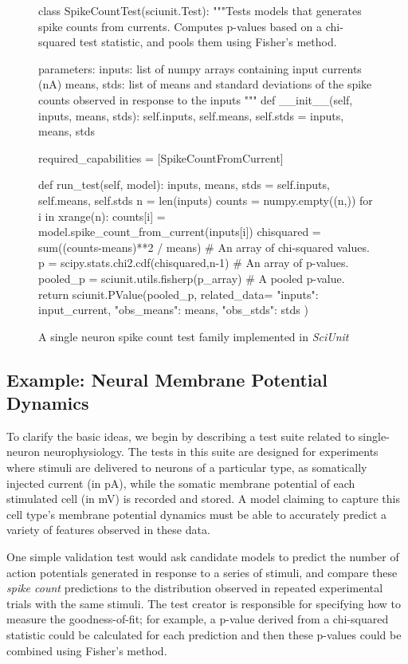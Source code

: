 \documentclass[11pt,letterpaper]{article}
\begin{document}
\begin{figure}
\small
\begin{python}
class SpikeCountTest(sciunit.Test):
  """Tests models that generates spike counts from currents. Computes p-values based on a chi-squared test statistic, and pools them using Fisher's method.

  parameters:
    inputs: list of numpy arrays containing input currents (nA)
    means, stds: list of means and standard deviations of the 
      spike counts observed in response to the inputs
  """
  def __init__(self, inputs, means, stds):
    self.inputs, self.means, self.stds = inputs, means, stds
	
  required_capabilities = [SpikeCountFromCurrent]
	
  def run_test(self, model):
    inputs, means, stds = self.inputs, self.means, self.stds
    n = len(inputs)
    counts = numpy.empty((n,))
    for i in xrange(n):
      counts[i] = model.spike_count_from_current(inputs[i])
    chisquared = sum((counts-means)**2 / means) # An array of chi-squared values.  
    p = scipy.stats.chi2.cdf(chisquared,n-1) # An array of p-values.  
    pooled_p = sciunit.utils.fisherp(p_array) # A pooled p-value.  
    return sciunit.PValue(pooled_p, related_data={
      "inputs": input_current,
      "obs_means": means,
      "obs_stds": stds
    })
\end{python}
\vspace{-5px}
\caption{A single neuron spike count test family implemented in \textit{SciUnit}}
\label{fig:rate_test}
\vspace{-15px}
\end{figure}

\subsection{Example: Neural Membrane Potential Dynamics} To clarify the basic ideas, we begin by describing a test suite related to single-neuron neurophysiology. 
The tests in this suite are designed for experiments where stimuli are delivered to neurons of a particular type, as somatically injected current (in pA), while the somatic membrane potential of each stimulated cell (in mV) is recorded and stored.  
A model claiming to capture this cell type's membrane potential dynamics must be able to accurately predict a variety of features observed in these data.

One simple validation test would ask candidate models to predict the number of action potentials generated in response to a series of stimuli, and compare these \emph{spike count} predictions to the distribution observed in repeated experimental trials with the same stimuli. 
The test creator is responsible for specifying how to measure the goodness-of-fit; 
for example, a p-value derived from a chi-squared statistic could be calculated for each prediction and then these p-values could be combined using Fisher's method\cite{fisher_statistical_1925}.
\end{document}
